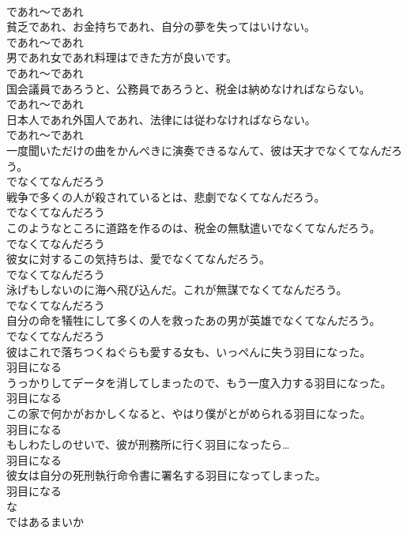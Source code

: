 \documentclass[8pt]{extreport}
\begin{document}
\begin{CJK}{UTF8}{min}
\\	であれ～であれ
\\	貧乏であれ、お金持ちであれ、自分の夢を失ってはいけない。	
\\	であれ～であれ
\\	男であれ女であれ料理はできた方が良いです。	
\\	であれ～であれ
\\	国会議員であろうと、公務員であろうと、税金は納めなければならない。	
\\	であれ～であれ
\\	日本人であれ外国人であれ、法律には従わなければならない。	
\\	であれ～であれ
\\	一度聞いただけの曲をかんぺきに演奏できるなんて、彼は天才でなくてなんだろう。	
\\	でなくてなんだろう
\\	戦争で多くの人が殺されているとは、悲劇でなくてなんだろう。	
\\	でなくてなんだろう
\\	このようなところに道路を作るのは、税金の無駄遣いでなくてなんだろう。	
\\	でなくてなんだろう
\\	彼女に対するこの気持ちは、愛でなくてなんだろう。	
\\	でなくてなんだろう
\\	泳げもしないのに海へ飛び込んだ。これが無謀でなくてなんだろう。	
\\	でなくてなんだろう
\\	自分の命を犠牲にして多くの人を救ったあの男が英雄でなくてなんだろう。	
\\	でなくてなんだろう
\\	彼はこれで落ちつくねぐらも愛する女も、いっぺんに失う羽目になった。	
\\	羽目になる
\\	うっかりしてデータを消してしまったので、もう一度入力する羽目になった。	
\\	羽目になる
\\	この家で何かがおかしくなると、やはり僕がとがめられる羽目になった。	
\\	羽目になる
\\	もしわたしのせいで、彼が刑務所に行く羽目になったら…	
\\	羽目になる
\\	彼女は自分の死刑執行命令書に署名する羽目になってしまった。	
\\	羽目になる
\\	な
\\	ではあるまいか	

\end{CJK}
\end{document}
